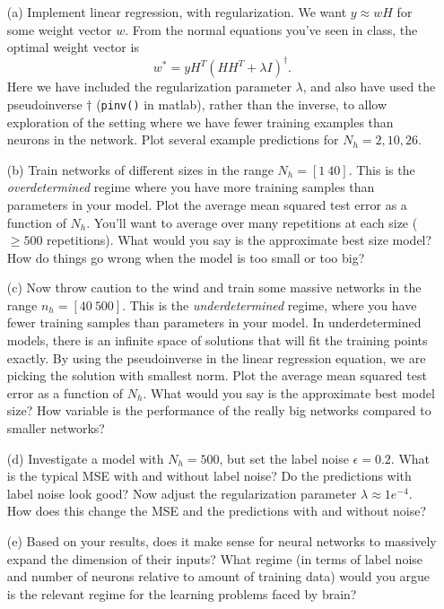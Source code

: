 \documentclass{article}
\begin{document}
\begin{itemize}
\begin{itemize}
\item[(a)] Implement linear regression, with regularization. We want $y\approx wH$ for some weight  vector $w$. From the normal equations you've seen in class, the optimal weight vector is 
\[w^*=yH^T(HH^T + \lambda I)^\dagger.\]
Here we have included the regularization parameter $\lambda$, and also have used the pseudoinverse $\dagger$ (\verb|pinv()| in matlab), rather than the inverse, to allow exploration of the setting where we have fewer training examples than neurons in the network. Plot several example predictions for $N_h=2,10,26$.
\item[(b)] Train networks of different sizes in the range $N_h = [1 ~ 40]$. This is the \textit{overdetermined} regime where you have more training samples than parameters in your model. Plot the average mean squared test error as a function of $N_h$.  You'll want to average over many repetitions at each size ($\geq500$ repetitions). What would you say is the approximate best size model? How do things go wrong when the model is too small or too big?
\item[(c)] Now throw caution to the wind and train some massive networks in the range $n_h = [40 ~ 500]$. This is the \textit{underdetermined} regime, where you have fewer training samples than parameters in your model. In underdetermined models, there is an infinite space of solutions that will fit the training points exactly. By using the pseudoinverse in the linear regression equation, we are picking the solution with smallest norm. Plot the average mean squared test error as a function of $N_h$.  What would you say is the approximate best model size? How variable is the performance of the really big networks compared to smaller networks?
\item[(d)] Investigate a model with $N_h=500$, but set the label noise $\epsilon=0.2$. What is the typical MSE with and without label noise? Do the predictions with label noise look good? Now adjust the regularization parameter $\lambda\approx1e^{-4}$. How does this change the MSE and the predictions with and without noise? 
\item[(e)] Based on your results, does it make sense for neural networks to massively expand the dimension of their inputs? What regime (in terms of label noise and number of neurons relative to amount of training data) would you argue is the relevant regime for the learning problems faced by brain?
\end{itemize}


\end{itemize}
\end{document}
